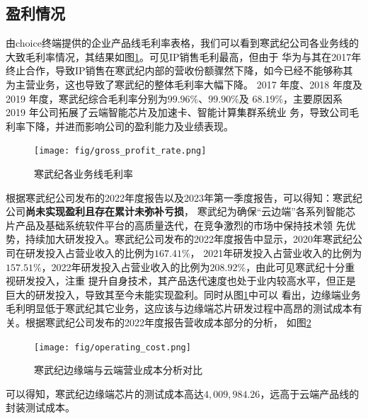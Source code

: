 \subsection{盈利情况}
由choice终端提供的企业产品线毛利率表格，我们可以看到寒武纪公司各业务线的大致毛利率情况，其结果如图\ref{gross_profit_rate}。可见IP销售毛利最高，但由于
华为与其在2017年终止合作，导致IP销售在寒武纪内部的营收份额骤然下降，如今已经不能够称其为主营业务，这也导致了寒武纪的整体毛利率大幅下降。
2017 年度、2018 年度及 2019 年度，寒武纪综合毛利率分别为$99.96\%$、$99.90\%$及
$68.19\%$，主要原因系 2019 年公司拓展了云端智能芯片及加速卡、智能计算集群系统业
务，导致公司毛利率下降，并进而影响公司的盈利能力及业绩表现。
\begin{figure}[!htb]
    \centering
    \texttt{[image: fig/gross\_profit\_rate.png]}
    \caption{寒武纪各业务线毛利率}
    \label{gross_profit_rate}
  \end{figure}
根据寒武纪公司发布的2022年度报告以及2023年第一季度报告，可以得知：寒武纪公司\textbf{尚未实现盈利且存在累计未弥补亏损}，
寒武纪为确保“云边端”各系列智能芯片产品及基础系统软件平台的高质量迭代，在竞争激烈的市场中保持技术领
先优势，持续加大研发投入。寒武纪公司发布的2022年度报告中显示，2020年寒武纪公司在研发投入占营业收入的比例为$167.41\%$，
2021年研发投入占营业收入的比例为$157.51\%$，2022年研发投入占营业收入的比例为$208.92\%$，由此可见寒武纪十分重视研发投入，注重
提升自身技术，其产品迭代速度也处于业内较高水平，但正是巨大的研发投入，导致其至今未能实现盈利。同时从图\ref{gross_profit_rate}中可以
看出，边缘端业务毛利明显低于寒武纪其它业务，这应该与边缘端芯片研发过程中高昂的测试成本有关。根据寒武纪公司发布的2022年度报告营收成本部分的分析，
如图\ref{operating_cost}
\begin{figure}[!htb]
  \centering
  \texttt{[image: fig/operating\_cost.png]}
  \caption{寒武纪边缘端与云端营业成本分析对比}
  \label{operating_cost}
\end{figure}
可以得知，寒武纪边缘端芯片的测试成本高达$4,009,984.26$，远高于云端产品线的封装测试成本。





